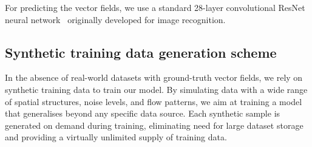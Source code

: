 \documentclass[a4paper,12pt]{article}
\begin{document}
For predicting the vector fields, we use a standard 28-layer convolutional ResNet neural network~\cite{resnet} originally developed for image recognition.

\subsection{Synthetic training data generation scheme}
In the absence of real-world datasets with ground-truth vector fields, we rely on synthetic training data to train our model.
By simulating data with a wide range of spatial structures, noise levels, and flow patterns, we aim at training a model that generalises beyond any specific data source.
Each synthetic sample is generated on demand during training, eliminating need for large dataset storage and providing a virtually unlimited supply of training data.
\end{document}
